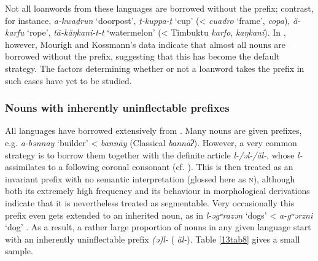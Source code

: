 \documentclass[output=paper,colorlinks,citecolor=brown]{langscibook}
\begin{document}
Not all loanwords from these languages are borrowed without the prefix; contrast, for instance,  \emph{a-kwaḏrun} `doorpost', \emph{ṯ-kuppa-ṯ} `cup' (\textless{}  \emph{cuadro} `frame', \emph{copa}),  \emph{ă-karfu} `rope', \emph{tă-kăŋkani-t-t} `watermelon' (\textless{} Timbuktu  \emph{karfo}, \emph{kaŋkani}). In , however, Mourigh and Kossmann's data indicate that almost all  nouns are borrowed without the prefix, suggesting that this has become the default strategy. The factors determining whether or not a loanword takes the prefix in such cases have yet to be studied.

\subsubsection{Nouns with inherently uninflectable prefixes} \label{13sec2.2.2}

All  languages have borrowed extensively from . Many  nouns are given  prefixes, e.g.  \emph{a-bənnay} `builder' \textless{} \emph{bannāy} (Classical \emph{bannāʔ}). However, a very common strategy is to borrow them together with the  definite article \emph{l-/əl-/ăl-}, whose \emph{l-} assimilates to a following coronal consonant (cf. \citealt[208]{kossmann2013}). This is then treated as an invariant prefix with no semantic interpretation (glossed here as \textsc{n}), although both its extremely high frequency and its behaviour in morphological derivations indicate that it is nevertheless treated as segmentable. Very occasionally this prefix even gets extended to an inherited  noun, as in  \emph{l-əgʷrazən} `dogs' \textless{} \emph{a-gʷərzni} `dog' \citep[76]{souag2013}. As a result, a rather large proportion of nouns in any given  language start with an inherently uninflectable prefix \emph{(ə)l-} ( \emph{ăl-}). Table \ref{13tab8} gives a small sample.
\end{document}
